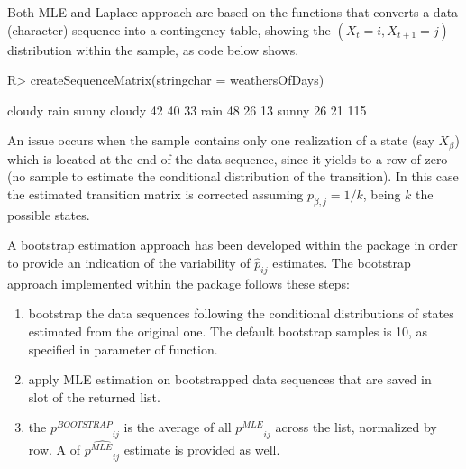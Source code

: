 \documentclass[nojss]{jss}
\begin{document}
Both MLE and Laplace approach are based on the 
functions that converts a data (character) sequence into a contingency table,
showing the $\left( X_{t}=i, X_{t+1}=j\right)$ distribution within the sample,
as code below shows. 

\begin{Schunk}
\begin{Sinput}
R> createSequenceMatrix(stringchar = weathersOfDays)
\end{Sinput}
\begin{Soutput}
       cloudy rain sunny
cloudy     42   40    33
rain       48   26    13
sunny      26   21   115
\end{Soutput}
\end{Schunk}


An issue occurs when the sample contains only one realization of a state (say $X_{\beta}$) which is located at the end of the data sequence, since it yields to a row of zero (no sample to estimate the conditional
distribution of the transition). In this case the estimated transition matrix is
corrected assuming $p_{\beta,j}=1/k$, being $k$ the possible states.

A bootstrap estimation approach has been developed within the package in order
to provide an indication of the variability of ${\hat p}_{ij}$ estimates. The
bootstrap approach implemented within the  package follows
these steps:

\begin{enumerate}
  \item bootstrap the data sequences following the conditional
  distributions of states estimated from the original one. The default bootstrap
  samples is 10, as specified in  parameter of 
  function.
  \item apply MLE estimation on bootstrapped data sequences that are saved in
\\   slot of the returned list.
  \item the ${p^{BOOTSTRAP}}_{ij}$ is the average of all ${p^{MLE}}_{ij}$ across
  the  list, normalized by row. A 
 of $\hat{{p^{MLE}}_{ij}}$ estimate is provided as well.
\end{enumerate}
\end{document}
